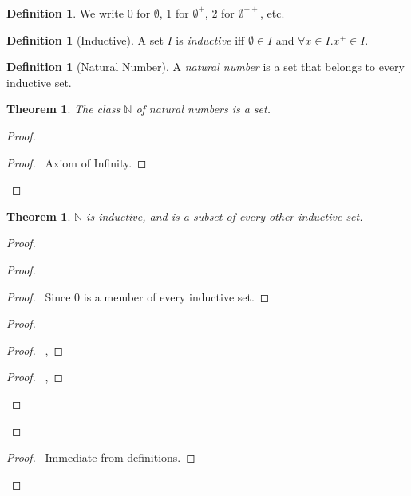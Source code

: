 \documentclass{book}
\let\qed\relax
\newtheorem{thm}[ax]{Theorem}
\theoremstyle{definition}
\newtheorem{df}[ax]{Definition}
\begin{document}
\begin{df}
We write 0 for $\emptyset$, 1 for $\emptyset^+$, 2 for $\emptyset^{++}$, etc.
\end{df}

\begin{df}[Inductive]
A set $I$ is \emph{inductive} iff $\emptyset \in I$ and $\forall x \in I. x^+ \in I$.
\end{df}

\begin{df}[Natural Number]
A \emph{natural number} is a set that belongs to every inductive set.
\end{df}

\begin{thm}
The class $\mathbb{N}$ of natural numbers is a set.
\end{thm}

\begin{proof}
\pf
{}
\begin{proof}
	\pf\ Axiom of Infinity.
\end{proof}
\qed
\end{proof}

\begin{thm}
$\mathbb{N}$ is inductive, and is a subset of every other inductive set.
\end{thm}

\begin{proof}
\pf
{}
\begin{proof}
	\begin{proof}
		\pf\ Since $0$ is a member of every inductive set.
	\end{proof}
	\begin{proof}
		\begin{proof}
			\pf\ , 
		\end{proof}
		\begin{proof}
			\pf\ , 
		\end{proof}
	\end{proof}
\end{proof}
\begin{proof}
	\pf\ Immediate from definitions.
\end{proof}
\qed
\end{proof}
\end{document}
